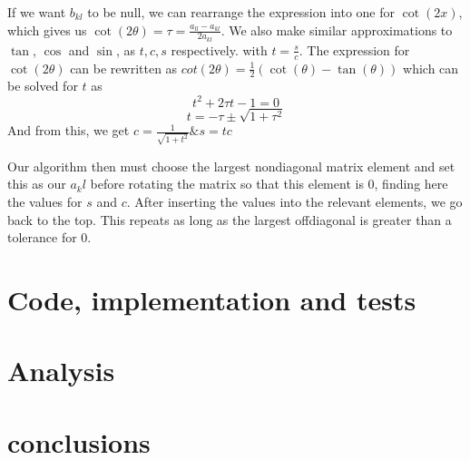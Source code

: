 \documentclass[10pt, twocolumn]{article}
\begin{document}
If we want $b_{kl}$ to be null, we can rearrange the expression into one for $\cot(2x)$\cite{rottmann2006matematisk}, 
which gives us $\cot(2\theta) = \tau = \frac{a_{ll} - a_{kl}}{2a_{kl}}$. We also make similar approximations to 
$\tan$, $\cos$ and $\sin$, as $t, c, s$ respectively. with $t = \frac{s}{c} $. The expression for $\cot(2\theta)$
can be rewritten as $cot(2\theta) = \frac{1}{2}(\cot(\theta) - \tan(\theta))$ which can be solved for $t$ as 
\[ t^2 + 2\tau t - 1 = 0 \]
\[ t = - \tau \pm \sqrt{1 + \tau^2} \]
And from this, we get $c = \frac{1}{\sqrt{1 + t^2}} \& s = tc$

Our algorithm then must choose the largest nondiagonal matrix element and set this as our $a_kl$ before rotating the 
matrix so that this element is 0, finding here the values for $s$ and $c$. After inserting the values into the 
relevant elements, we go back to the top. This repeats as long as the largest offdiagonal is greater than a tolerance 
for 0.

\section{Code, implementation and tests}

\section{Analysis}


\section{conclusions}




\end{document}
